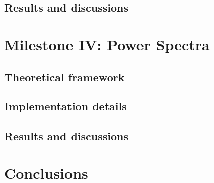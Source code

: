 \documentclass{aa}
\begin{document}
\subsection{Results and discussions}\label{subsec: III results}



\section{Milestone IV: Power Spectra}\label{sec: milestone IV}

\subsection{Theoretical framework}\label{subsec: IV theory}

\subsection{Implementation details}\label{subsec: IV methods}

\subsection{Results and discussions}\label{subsec: IV results}


\section{Conclusions}\label{sec: conclusions}

\end{document}

